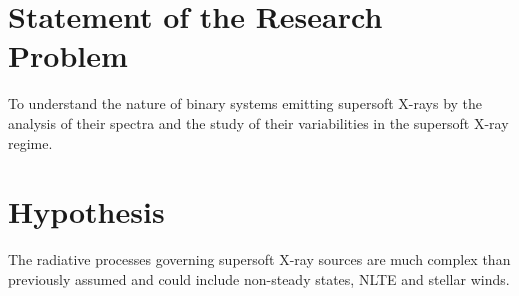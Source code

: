    \section{Statement of the Research Problem} \label{introduction:problem_statement}
    	To understand the nature of binary systems emitting supersoft X-rays by the analysis of their spectra and the study of their variabilities in the supersoft X-ray regime.
        
    \section{Hypothesis} \label{introduction:hypothesis}
    	The radiative processes governing supersoft X-ray sources are much complex than previously assumed and could include non-steady states, NLTE and stellar winds.
    

